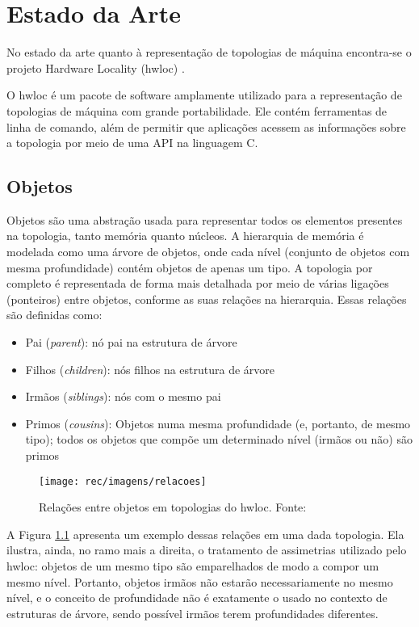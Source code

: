 \chapter{Estado da Arte} %
\label{cap:estado_da_arte}
\acresetall


No estado da arte quanto à representação de topologias de máquina encontra-se o projeto Hardware Locality (hwloc) \cite{hwloc2010}.

O hwloc é um pacote de software amplamente utilizado para a representação de topologias de máquina com grande portabilidade.
Ele contém ferramentas de linha de comando, além de permitir que aplicações acessem as informações sobre a topologia por meio de uma API na linguagem C.



\section{Objetos}
\label{sec:objetos}

Objetos são uma abstração usada para representar todos os elementos presentes na topologia, tanto memória quanto núcleos.
A hierarquia de memória é modelada como uma árvore de objetos, onde cada nível (conjunto de objetos com mesma profundidade) contém objetos de apenas um tipo.
A topologia por completo é representada de forma mais detalhada por meio de várias ligações (ponteiros) entre objetos, conforme as suas relações na hierarquia.
Essas relações são definidas como:
\begin{itemize}
	\item Pai (\textit{parent}): nó pai na estrutura de árvore
	\item Filhos (\textit{children}): nós filhos na estrutura de árvore
	\item Irmãos (\textit{siblings}): nós com o mesmo pai
	\item Primos (\textit{cousins}): Objetos numa mesma profundidade (e, portanto, de mesmo tipo); todos os objetos que compõe um determinado nível (irmãos ou não) são primos
\end{itemize}
\begin{figure}[h]
	\caption{Relações entre objetos em topologias do hwloc. Fonte: \cite{hwlocImg}}
	\label{fig:relacoes}
	\texttt{[image: rec/imagens/relacoes]}
\end{figure}
A Figura \ref{fig:relacoes} apresenta um exemplo dessas relações em uma dada topologia.
Ela ilustra, ainda, no ramo mais a direita, o tratamento de assimetrias utilizado pelo hwloc: objetos de um mesmo tipo são emparelhados de modo a compor um mesmo nível.
Portanto, objetos irmãos não estarão necessariamente no mesmo nível, e o conceito de profundidade não é exatamente o usado no contexto de estruturas de árvore, sendo possível irmãos terem profundidades diferentes.

